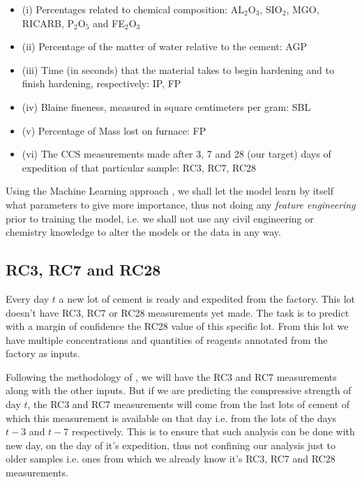\documentclass[11pt]{article}
\begin{document}
\begin{itemize}
\item (i) Percentages related to chemical composition: AL\(_{\text{2}}\)O\(_{\text{3}}\), SIO\(_{\text{2}}\), MGO, RICARB, P\(_{\text{2}}\)O\(_{\text{5}}\) and FE\(_{\text{2}}\)O\(_{\text{3}}\)
\item (ii) Percentage of the matter of water relative to the cement: AGP
\item (iii) Time (in seconds) that the material takes to begin hardening and to finish hardening, respectively: IP, FP
\item (iv) Blaine fineness, measured in square centimeters per gram: SBL
\item (v) Percentage of Mass lost on furnace: FP
\item (vi) The CCS measurements made after 3, 7 and 28 (our target) days of expedition of that particular sample: RC3, RC7, RC28
\end{itemize}


Using the Machine Learning approach \cite{dlbook},  we shall let the model learn by itself what parameters to give more importance, 
thus not doing any \emph{feature engineering} prior to training the model, i.e. we shall not 
use any civil engineering or chemistry knowledge to alter the models or the data in any way.

\subsection{RC3, RC7 and RC28}
\label{sec:org525ff82}
Every day \(t\) a new lot of cement is ready and expedited from the factory. This lot doesn't have RC3, RC7 or RC28 measurements yet made. The task is to predict with a margin of confidence 
the RC28 value of this specific lot. From this lot we have multiple concentrations and quantities of reagents annotated from the factory as inputs.

Following the methodology of \cite{greciaLin}, we will have the RC3 and RC7 measurements along with the other inputs. But if we are predicting the compressive strength of day \(t\), the RC3 and RC7 measurements
will come from the last lots of cement of which this measurement is available on that day i.e. from the lots of the days \(t-3\) and \(t-7\) respectively. This is to ensure that such analysis
can be done with new day, on the day of it's expedition, thus not confining our analysis just to older samples i.e. ones from which we already know it's RC3, RC7 and RC28 measurements. 
\end{document}
